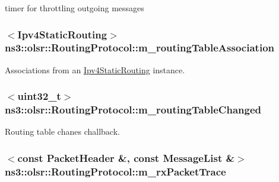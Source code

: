 timer for throttling outgoing messages 

\subsubsection[{\texorpdfstring{m\+\_\+routing\+Table\+Association}{m_routingTableAssociation}}]{$<${\bf Ipv4\+Static\+Routing}$>$ ns3\+::olsr\+::\+Routing\+Protocol\+::m\+\_\+routing\+Table\+Association\hspace{0.3cm}{\ttfamily [private]}}\hypertarget{classns3_1_1olsr_1_1RoutingProtocol_ae631ae3941f563718274166203d3b178}{}\label{classns3_1_1olsr_1_1RoutingProtocol_ae631ae3941f563718274166203d3b178}


Associations from an \hyperlink{classns3_1_1Ipv4StaticRouting}{Ipv4\+Static\+Routing} instance. 

\subsubsection[{\texorpdfstring{m\+\_\+routing\+Table\+Changed}{m_routingTableChanged}}]{$<$uint32\+\_\+t$>$ ns3\+::olsr\+::\+Routing\+Protocol\+::m\+\_\+routing\+Table\+Changed\hspace{0.3cm}{\ttfamily [private]}}\hypertarget{classns3_1_1olsr_1_1RoutingProtocol_a1cbaa4bdf90462b6d8e0ddc90eaa4130}{}\label{classns3_1_1olsr_1_1RoutingProtocol_a1cbaa4bdf90462b6d8e0ddc90eaa4130}


Routing table chanes challback. 

\subsubsection[{\texorpdfstring{m\+\_\+rx\+Packet\+Trace}{m_rxPacketTrace}}]{$<$const {\bf Packet\+Header} \&, const {\bf Message\+List} \&$>$ ns3\+::olsr\+::\+Routing\+Protocol\+::m\+\_\+rx\+Packet\+Trace\hspace{0.3cm}{\ttfamily [private]}}\hypertarget{classns3_1_1olsr_1_1RoutingProtocol_a861b1d2ce370ab0137e67c5a1102a937}{}\label{classns3_1_1olsr_1_1RoutingProtocol_a861b1d2ce370ab0137e67c5a1102a937}


